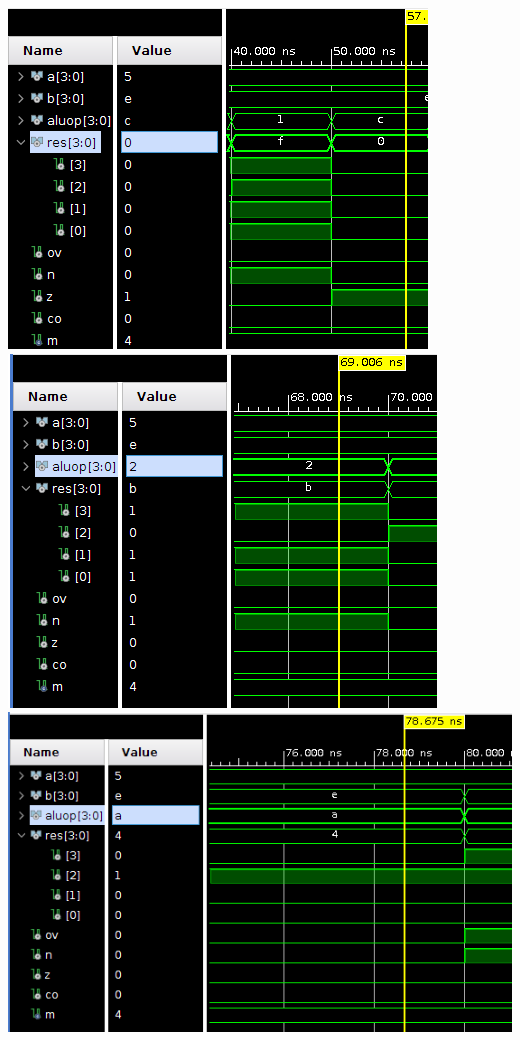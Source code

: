 \documentclass[12pt,executivepaper]{article}
\begin{document}
\begin{center}
    \includegraphics[scale=0.666]{imgs/seis.png}\\
    \includegraphics[scale=0.666]{imgs/siete.png}\\
    \includegraphics[scale=0.666]{imgs/ocho.png}\\

\end{center}
\end{document}

